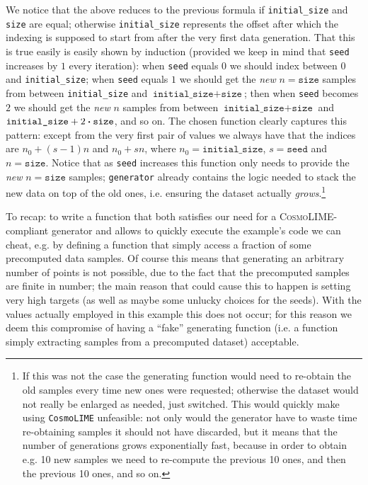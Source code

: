 We notice that the above reduces to the previous formula if \texttt{initial\_size} and \texttt{size} are equal; otherwise \texttt{initial\_size} represents the offset after which the indexing is supposed to start from after the very first data generation. That this is true easily is easily shown by induction (provided we keep in mind that \texttt{seed} increases by $1$ every iteration): when \texttt{seed} equals $0$ we should index between $0$ and \texttt{initial\_size}; when \texttt{seed} equals $1$ we should get the \emph{new} $n = \texttt{size}$ samples from between \texttt{initial\_size} and $\texttt{initial\_size}+\texttt{size}$; then when \texttt{seed} becomes $2$ we should get the \emph{new} $n$ samples from between $\texttt{initial\_size} + \texttt{size}$ and $\texttt{initial\_size} + 2\vdot\texttt{size}$, and so on. The chosen function clearly captures this pattern: except from the very first pair of values we always have that the indices are $n_0+(s-1)n$ and $n_0 +sn$, where $n_0 = \texttt{initial\_size}$, $s = \texttt{seed}$ and $n = \texttt{size}$. Notice that as \texttt{seed} increases this function only needs to provide the \emph{new} $n = \texttt{size}$ samples; \texttt{generator} already contains the logic needed to stack the new data on top of the old ones, i.e. ensuring the dataset actually \emph{grows}.\footnote{If this was not the case the generating function would need to re-obtain the old samples every time new ones were requested; otherwise the dataset would not really be enlarged as needed, just switched. This would quickly make using \texttt{CosmoLIME} unfeasible: not only would the generator have to waste time re-obtaining samples it should not have discarded, but it means that the number of generations grows exponentially fast, because in order to obtain e.g. 10 new samples we need to re-compute the previous 10 ones, and then the previous 10 ones, and so on.}


To recap: to write a function that both satisfies our need for a \textsc{CosmoLIME}-compliant generator and allows to quickly execute the example's code we can cheat, e.g. by defining a function that simply access a fraction of some precomputed data samples. Of course this means that generating an arbitrary number of points is not possible, due to the fact that the precomputed samples are finite in number; 
the main reason that could cause this to happen is setting very high targets (as well as maybe some unlucky choices for the seeds). With the values actually employed in this example this does not occur; for this reason we deem this compromise of having a ``fake'' generating function (i.e. a function simply extracting samples from a precomputed dataset) acceptable.


